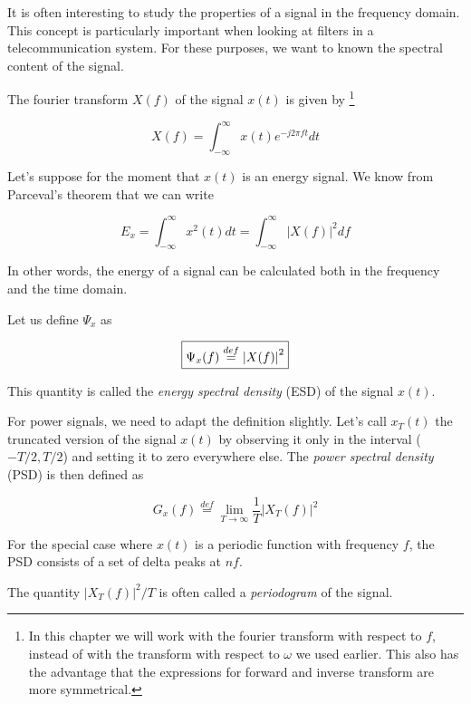 It is often interesting to study the properties of a signal in the frequency domain. This concept is particularly important when looking at filters in a telecommunication system. For these purposes, we want to known the spectral content of the signal.

The fourier transform $X(f)$ of the signal $x(t)$ is given by \footnote{In this chapter we will work with the fourier transform with respect to $f$, instead of with the transform with respect to $\omega$ we used earlier. This also has the advantage that the expressions for forward and inverse transform are more symmetrical.}

\begin{equation}
X(f) = \int_{-\infty}^{\infty} x(t) e^{-j 2 \pi f t} dt \label{eq-fourier}
\end{equation} 

Let's suppose for the moment that $x(t)$ is an energy signal. We know from Parceval's theorem that we can write

\begin{equation}
E_x = \int_{-\infty}^{\infty} x^2(t) dt = \int_{-\infty}^{\infty}  \left | X(f) \right |^2 df
\end{equation} 

In other words, the energy of a signal can be calculated both in the frequency and the time domain. 

Let us define $\Psi_x$ as

\begin{equation}
\fbox{$\displaystyle
\Psi_x(f) \stackrel{def}{=} \left | X(f) \right |^2
$}
\end{equation} 

This quantity is called the \emph{energy spectral density} (ESD) of the signal $x(t)$.

For power signals, we need to adapt the definition slightly. Let's call $x_T(t)$ the truncated version of the signal $x(t)$ by observing it only in the interval ($-T/2,T/2$) and setting it to zero everywhere else. The \emph{power spectral density} (PSD) is then defined as

\begin{equation}
G_x(f) \stackrel{def}{=}  \lim_{T \to \infty }\frac{1}{T}\left | X_T(f) \right |^2 \label{eq-psd}
\end{equation} 

For the special case where $x(t)$ is a periodic function with frequency $f$, the PSD consists of a set of delta peaks at $n f$.

The quantity $\left | X_T(f) \right |^2 / T$ is often called a \emph{periodogram} of the signal.

